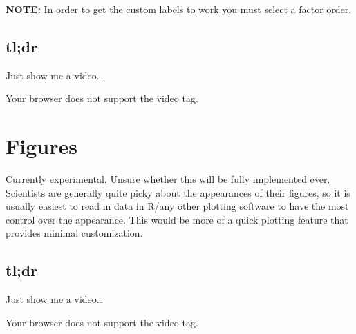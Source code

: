 \documentclass[
]{book}
\begin{document}
\textbf{NOTE:} In order to get the custom labels to work you must select a factor order.

\section{tl;dr}\label{tldr-3}

Just show me a video\ldots{}

Your browser does not support the video tag.

\chapter{Figures}\label{figures}

Currently experimental. Unsure whether this will be fully implemented ever. Scientists are generally quite picky about the appearances of their figures, so it is usually easiest to read in data in R/any other plotting software to have the most control over the appearance. This would be more of a quick plotting feature that provides minimal customization.

\section{tl;dr}\label{tldr-4}

Just show me a video\ldots{}

Your browser does not support the video tag.

  
\end{document}
